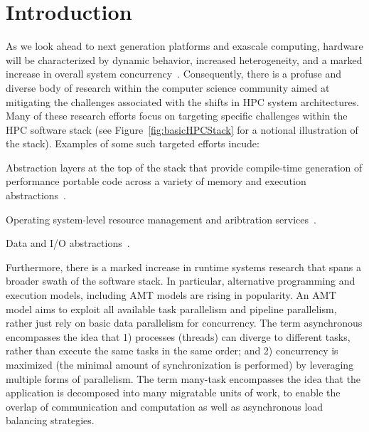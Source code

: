 
\chapter{Introduction}
\label{chap:introduction}
As we look ahead to next generation platforms and exascale computing,  hardware 
will be characterized by dynamic behavior, increased
heterogeneity, and a marked increase in overall system \gls{concurrency}~\cite{doe_arch, dav_exascale}. 
Consequently, there is a profuse and diverse body of research within the
computer science community aimed at mitigating the challenges associated with
the shifts in \gls{HPC} system architectures.  Many of these research efforts focus on targeting
specific challenges within the \gls{HPC} software stack (see
Figure~\ref{fig:basicHPCStack} for a notional illustration of the stack).
Examples of some such targeted efforts incude:
\begin{compactenum}
\item Abstraction layers at the top of the stack that provide compile-time generation 
of performance portable code across a variety of memory and execution
abstractions~\cite{Kokkos, RAJA}. 
\item Operating system-level resource management and aribtration services~\cite{Qthreads, Hobbs, Kitten}. 
\item Data and I/O abstractions~\cite{Kelpie, Nessie, Adios, DataSpaces, LLNLandLANLDW}.  
\end{compactenum}

Furthermore, there is a marked increase in runtime systems
research that spans a broader swath of the software stack.  In particular, 
alternative programming  and \glspl{execution model}, including \gls{AMT}
models are rising in popularity.  
An \gls{AMT} model aims to exploit all available \gls{task parallelism} and
\gls{pipeline parallelism}, rather just rely on basic \gls{data parallelism}
for \gls{concurrency}. The term asynchronous encompasses the idea that 
1) processes (threads) can diverge to different tasks, rather than execute 
the same tasks in the same order; and 2) concurrency is maximized (the 
  minimal amount of synchronization is performed) by 
leveraging multiple forms of parallelism. The term many-task encompasses 
the idea that the application is decomposed into many 
\gls{migratable} units of work, to enable the overlap of communication and 
computation as well as asynchronous load balancing strategies.

